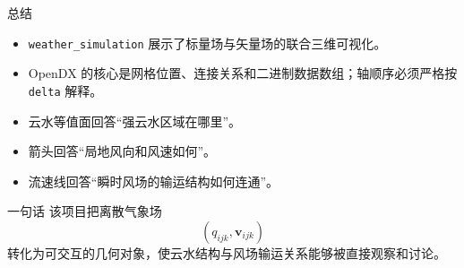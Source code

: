 \documentclass[aspectratio=169,11pt]{ctexbeamer}
\newcommand{\vv}{\mathbf v}
\begin{document}
\begin{frame}{总结}
  \begin{itemize}
    \item \texttt{weather\_simulation} 展示了标量场与矢量场的联合三维可视化。
    \item OpenDX 的核心是网格位置、连接关系和二进制数据数组；轴顺序必须严格按 \texttt{delta} 解释。
    \item 云水等值面回答“强云水区域在哪里”。
    \item 箭头回答“局地风向和风速如何”。
    \item 流速线回答“瞬时风场的输运结构如何连通”。
  \end{itemize}

  \begin{block}{一句话}
    该项目把离散气象场
    \[
      (q_{ijk},\vv_{ijk})
    \]
    转化为可交互的几何对象，使云水结构与风场输运关系能够被直接观察和讨论。
  \end{block}
\end{frame}
\end{document}
